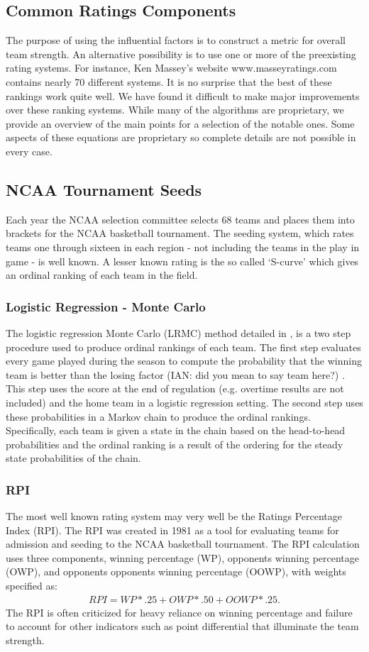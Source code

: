 \subsection{Common Ratings Components} The purpose of using the influential factors is to construct a metric for overall team strength.  An alternative possibility is to use one or more of the preexisting rating systems.  For instance, Ken Massey's website www.masseyratings.com contains nearly 70 different systems.  It is no surprise that the best of these rankings work quite well.  We have found it difficult to make major improvements over these ranking systems.  While many of the algorithms are proprietary, we provide an overview of the main points for a selection of the notable ones.  Some aspects of these equations are proprietary so complete details are not possible in every case. 
\subsection{NCAA Tournament Seeds}
Each year the NCAA selection committee selects 68 teams and places them into brackets for the NCAA basketball tournament.  The seeding system, which rates teams one through sixteen in each region - not including the teams in the play in game - is well known.  A lesser known rating is the so called `S-curve' which gives an ordinal ranking of each team in the field.  
\subsubsection{Logistic Regression - Monte Carlo}
The logistic regression Monte Carlo (LRMC) method detailed in \cite{Kvam2006}, \cite{mark2010} is a two step procedure used to produce ordinal rankings of each team.  The first step evaluates every game played during the season to compute the probability that the winning team is better than the losing factor (IAN: did you mean to say team here?) .  This step uses the score at the end of regulation (e.g. overtime results are not included) and the home team in a logistic regression setting.  The second step uses these probabilities in a Markov chain to produce the ordinal rankings.  Specifically, each team is given a state in the chain based on the head-to-head probabilities and the ordinal ranking is a result of the ordering for the steady state probabilities of the chain.

\subsubsection{RPI}
The most well known rating system may very well be the Ratings Percentage Index (RPI).  The RPI was created in 1981 as a tool for evaluating teams for admission and seeding to the NCAA basketball tournament.  The RPI calculation uses three components, winning percentage (WP), opponents winning percentage (OWP), and opponents opponents winning percentage (OOWP), with weights specified as:
\begin{eqnarray*}
RPI = WP *.25 + OWP * .50 + OOWP *.25.
\end{eqnarray*}
The RPI is often criticized for heavy reliance on winning percentage and failure to account for other indicators such as point differential that illuminate the team strength.

